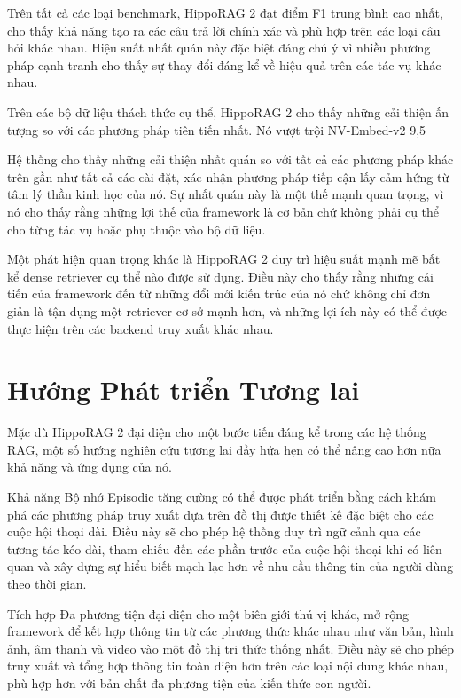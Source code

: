 \documentclass[../main.tex]{subfiles}
\begin{document}
Trên tất cả các loại benchmark, HippoRAG 2 đạt điểm F1 trung bình cao nhất, cho thấy khả năng tạo ra các câu trả lời chính xác và phù hợp trên các loại câu hỏi khác nhau. Hiệu suất nhất quán này đặc biệt đáng chú ý vì nhiều phương pháp cạnh tranh cho thấy sự thay đổi đáng kể về hiệu quả trên các tác vụ khác nhau.

Trên các bộ dữ liệu thách thức cụ thể, HippoRAG 2 cho thấy những cải thiện ấn tượng so với các phương pháp tiên tiến nhất. Nó vượt trội NV-Embed-v2 9,5%

Hệ thống cho thấy những cải thiện nhất quán so với tất cả các phương pháp khác trên gần như tất cả các cài đặt, xác nhận phương pháp tiếp cận lấy cảm hứng từ tâm lý thần kinh học của nó. Sự nhất quán này là một thế mạnh quan trọng, vì nó cho thấy rằng những lợi thế của framework là cơ bản chứ không phải cụ thể cho từng tác vụ hoặc phụ thuộc vào bộ dữ liệu.

Một phát hiện quan trọng khác là HippoRAG 2 duy trì hiệu suất mạnh mẽ bất kể dense retriever cụ thể nào được sử dụng. Điều này cho thấy rằng những cải tiến của framework đến từ những đổi mới kiến trúc của nó chứ không chỉ đơn giản là tận dụng một retriever cơ sở mạnh hơn, và những lợi ích này có thể được thực hiện trên các backend truy xuất khác nhau.

\section{Hướng Phát triển Tương lai}
Mặc dù HippoRAG 2 đại diện cho một bước tiến đáng kể trong các hệ thống RAG, một số hướng nghiên cứu tương lai đầy hứa hẹn có thể nâng cao hơn nữa khả năng và ứng dụng của nó.

Khả năng Bộ nhớ Episodic tăng cường có thể được phát triển bằng cách khám phá các phương pháp truy xuất dựa trên đồ thị được thiết kế đặc biệt cho các cuộc hội thoại dài. Điều này sẽ cho phép hệ thống duy trì ngữ cảnh qua các tương tác kéo dài, tham chiếu đến các phần trước của cuộc hội thoại khi có liên quan và xây dựng sự hiểu biết mạch lạc hơn về nhu cầu thông tin của người dùng theo thời gian.

Tích hợp Đa phương tiện đại diện cho một biên giới thú vị khác, mở rộng framework để kết hợp thông tin từ các phương thức khác nhau như văn bản, hình ảnh, âm thanh và video vào một đồ thị tri thức thống nhất. Điều này sẽ cho phép truy xuất và tổng hợp thông tin toàn diện hơn trên các loại nội dung khác nhau, phù hợp hơn với bản chất đa phương tiện của kiến thức con người.
\end{document}
